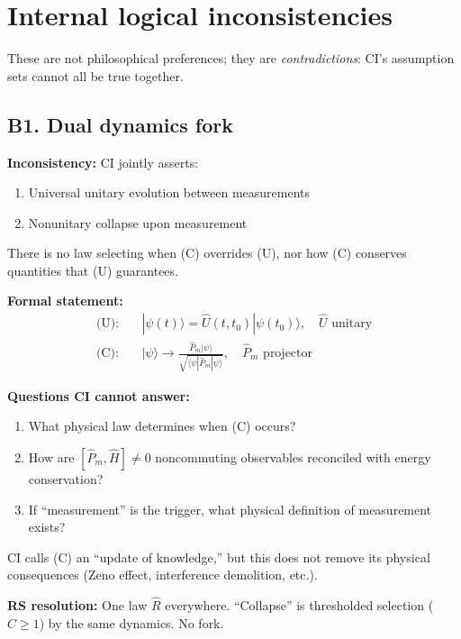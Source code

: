 \documentclass[11pt]{article}
\begin{document}
\section{Internal logical inconsistencies}

These are not philosophical preferences; they are \emph{contradictions}: CI's assumption sets cannot all be true together.

\subsection{B1. Dual dynamics fork}

\begin{alertbox}
\textbf{Inconsistency:} CI jointly asserts:
\begin{enumerate}[label=(\Alph*),nosep]
  \item Universal unitary evolution between measurements
  \item Nonunitary collapse upon measurement
\end{enumerate}
There is no law selecting when (C) overrides (U), nor how (C) conserves quantities that (U) guarantees.
\end{alertbox}

\textbf{Formal statement:}
\begin{align*}
  \text{(U):} \quad & |\psi(t)\rangle = \hat U(t,t_0)|\psi(t_0)\rangle, \quad \hat U \text{ unitary} \\
  \text{(C):} \quad & |\psi\rangle \to \frac{\hat P_m |\psi\rangle}{\sqrt{\langle\psi|\hat P_m|\psi\rangle}}, \quad \hat P_m \text{ projector}
\end{align*}

\textbf{Questions CI cannot answer:}
\begin{enumerate}[nosep]
  \item What physical law determines when (C) occurs?
  \item How are $[\hat P_m, \hat H]\ne 0$ noncommuting observables reconciled with energy conservation?
  \item If ``measurement'' is the trigger, what physical definition of measurement exists?
\end{enumerate}

CI calls (C) an ``update of knowledge,'' but this does not remove its physical consequences (Zeno effect, interference demolition, etc.).

\textbf{RS resolution:} One law $\hat R$ everywhere. ``Collapse'' is thresholded selection ($C\ge 1$) by the same dynamics. No fork.
\end{document}
